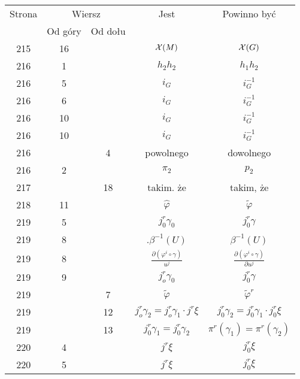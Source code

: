\documentclass[a4paper,11pt]{article}
\begin{document}
\begin{center}
  \begin{tabular}{|c|c|c|c|c|}
    \hline
    Strona & \multicolumn{2}{c|}{Wiersz} & Jest
                              & Powinno być \\ \cline{2-3}
    & Od góry & Od dołu & & \\
    \hline
    215 & 16 & & $\mathcal{X}( M )$ & $\mathcal{X}( G )$ \\
    216 & \hphantom{0}1 & & $h_{ 2 } h_{ 2 }$ & $h_{ 1 } h_{ 2 }$ \\
    216 & \hphantom{0}5 & & $i_{ G }$ & $i^{ -1 }_{ G }$ \\
    216 & \hphantom{0}6 & & $i_{ G }$ & $i^{ -1 }_{ G }$ \\
    216 & 10 & & $i_{ G }$ & $i^{ -1 }_{ G }$ \\
    216 & 10 & & $i_{ G }$ & $i^{ -1 }_{ G }$ \\
    216 & & \hphantom{0}4 & powolnego & dowolnego \\
    216 & \hphantom{0}2 & & $\pi_{ 2 }$ & $p_{ 2 }$ \\
    217 & & 18 & takim. że & takim, że \\
    218 & 11 & & $\widehat{ \varphi }$ & $\widetilde{ \varphi }$ \\
    219 & \hphantom{0}5 & & $j^{ r }_{ 0 } \gamma_{ 0 }$ & $j^{ r }_{ 0 } \gamma$ \\
    219 & \hphantom{0}8 & & $.\beta^{ -1 }( U )$ & $\beta^{ -1 }( U )$ \\
    219 & \hphantom{0}8 & & $\frac{ \partial ( \varphi^{ i } \circ \gamma ) }{ u^{ j } }$
           & $\frac{ \partial ( \varphi^{ i } \circ \gamma ) }{ \partial u^{ j } }$ \\
    219 & \hphantom{0}9 & & $j_{ o }^{ r } \gamma_{ 0 }$ & $j_{ 0 }^{ r } \gamma$ \\
    219 & & \hphantom{0}7 & $\widetilde{ \varphi }$ & $\widetilde{ \varphi }^{ r }$ \\
    219 & & 12 & $j^{ r }_{ o } \gamma_{ 2 }
                 = j^{ r }_{ o } \gamma_{ 1 } \cdot j^{ r } \xi$
           & $j^{ r }_{ 0 } \gamma_{ 2 }
             = j^{ r }_{ 0 } \gamma_{ 1 } \cdot j^{ r }_{ 0 } \xi$ \\
    219 & & 13 & $j_{ 0 }^{ r } \gamma_{ 1 } = j_{ 0 }^{ r } \gamma_{ 2 }$
           & $\pi^{ r } ( \gamma_{ 1 } ) = \pi^{ r }( \gamma_{ 2 } )$ \\
    220 & \hphantom{0}4 & & $j^{ r } \xi$ & $j^{ r }_{ 0 } \xi$ \\
    220 & \hphantom{0}5 & & $j^{ r } \xi$ & $j^{ r }_{ 0 } \xi$ \\

\end{tabular}
\end{center}
\end{document}
